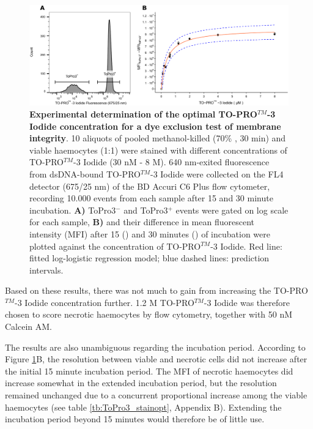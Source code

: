 \begin{figure}[h]
    \centering
    \includegraphics[width=1.0\textwidth]{figures/Method development/ToPro3 stainopt LL4 figure.pdf}
    \caption{\textbf{Experimental determination of the optimal TO-PRO$^{TM}$-3 Iodide concentration for a dye exclusion test of membrane integrity}. 10 aliquots of pooled methanol-killed (70\% , 30 min) and viable haemocytes (1:1) were stained with different concentrations of TO-PRO$^{TM}$-3 Iodide (30 nM - 8 \micro M). 640 nm-exited fluorescence from dsDNA-bound TO-PRO$^{TM}$-3 Iodide were collected on the FL4 detector (675/25 nm) of the BD Accuri C6 Plus flow cytometer, recording 10.000 events from each sample after 15 and 30 minute incubation. \textbf{A)} ToPro3$^{-}$ and ToPro3$^{+}$ events were gated on log scale for each sample, \textbf{B)} and their difference in mean fluorescent intensity (MFI) after 15 (\protect\lysegraacircle) and 30 minutes (\protect\darkgraycircle) of incubation were plotted against the concentration of TO-PRO$^{TM}$-3 Iodide. Red line: fitted log-logistic regression model; blue dashed lines: prediction intervals.}
    \label{fig:ToPro3_stain_opt}
\end{figure}

Based on these results, there was not much to gain from increasing the TO-PRO$^{TM}$-3 Iodide concentration further. 1.2 \micro M TO-PRO$^{TM}$-3 Iodide was therefore chosen to score necrotic haemocytes by flow cytometry, together with 50 nM Calcein AM.

The results are also unambiguous regarding the incubation period. According to Figure \ref{fig:ToPro3_stain_opt}B, the resolution between viable and necrotic cells did not increase after the initial 15 minute incubation period. The MFI of necrotic haemocytes did increase somewhat in the extended incubation period, but the resolution remained unchanged due to a concurrent proportional increase among the viable haemocytes (see table \ref{tb:ToPro3_stainopt}, Appendix B). Extending the incubation period beyond 15 minutes would therefore be of little use.


























